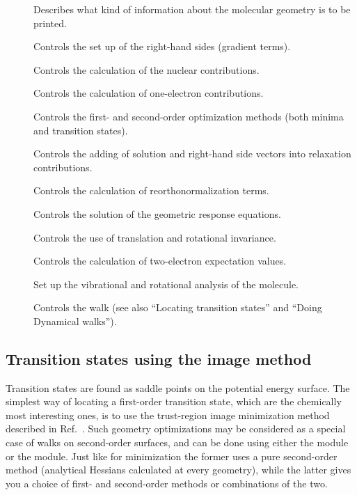 \begin{description}
\item[] Describes what kind  of information about the
molecular geometry is to be printed.
\item[] Controls the set up of the right-hand sides
(gradient terms).
\item[] Controls the calculation of the nuclear contributions.
\item[] Controls the calculation of one-electron contributions.
\item[] Controls the first- and second-order
optimization methods (both minima and transition states).
\item[] Controls the adding of solution and right-hand side vectors
into relaxation contributions.
\item[] Controls the calculation of reorthonormalization terms.
\item[] Controls the solution of the geometric response equations.
\item[] Controls the use of translation and rotational invariance.
\item[] Controls the calculation of two-electron
expectation values.
\item[] Set up the vibrational and rotational analysis of the
molecule.
\item[] Controls the walk (see also ``Locating transition
states'' and ``Doing Dynamical walks'').
\end{description}

\subsection{Transition states using the image method}
\label{sec:image}

\begin{center}
\end{center}

Transition states are found as saddle points
on the potential energy surface.  The simplest
way of locating a first-order transition state, which are the
chemically most interesting ones, is to use the trust-region
image minimization method
described in Ref.~\cite{thcpl182}. Such geometry optimizations may
be considered as a special case of walks on second-order surfaces, and
can be done using either the  module or the 
module. Just like for minimization the former uses a pure second-order
method (analytical Hessians calculated at every geometry), while the
latter gives you a choice of first- and second-order methods or
combinations of the two.

